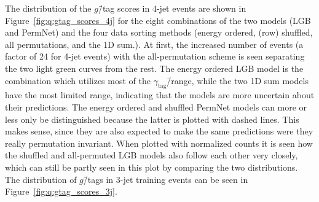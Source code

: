 The distribution of the $g$\=/tag scores in 4-jet events are shown in Figure~\ref{fig:q:gtag_scores_4j} for the eight combinations of the two models (LGB and PermNet) and the four data sorting methods (energy ordered, (row) shuffled, all permutations, and the 1D sum.). At first, the increased number of events (a factor of \num{24} for 4-jet events) with the all-permutation scheme is seen separating the two light green curves from the rest. The energy ordered LGB model is the combination which utilizes most of the $\gamma_\mathrm{tag}$\=/range, while the two 1D sum models have the most limited range, indicating that the models are more uncertain about their predictions. The energy ordered and shuffled PermNet models can more or less only be distinguished because the latter is plotted with dashed lines. This makes sense, since they are also expected to make the same predictions were they really permutation invariant. When plotted with normalized counts it is seen how the shuffled and all-permuted LGB models also follow each other very closely, which can still be partly seen in this plot by comparing the two distributions. The distribution of $g$\=/tags in 3-jet training events can be seen in Figure~\ref{fig:q:gtag_scores_3j}. 

